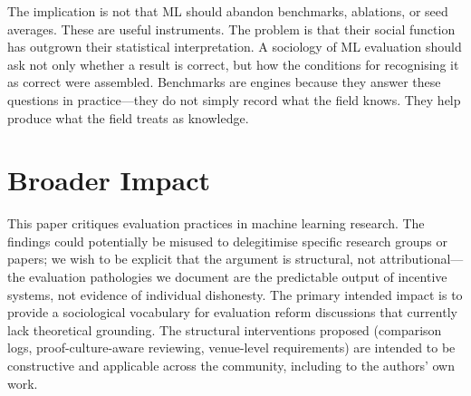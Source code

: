 \documentclass{article}
\begin{document}
The implication is not that ML should abandon benchmarks, ablations, or seed averages. These are useful instruments. The problem is that their social function has outgrown their statistical interpretation. A sociology of ML evaluation should ask not only whether a result is correct, but how the conditions for recognising it as correct were assembled. Benchmarks are engines because they answer these questions in practice---they do not simply record what the field knows. They help produce what the field treats as knowledge.

\section*{Broader Impact}

This paper critiques evaluation practices in machine learning research. The findings could potentially be misused to delegitimise specific research groups or papers; we wish to be explicit that the argument is structural, not attributional---the evaluation pathologies we document are the predictable output of incentive systems, not evidence of individual dishonesty. The primary intended impact is to provide a sociological vocabulary for evaluation reform discussions that currently lack theoretical grounding. The structural interventions proposed (comparison logs, proof-culture-aware reviewing, venue-level requirements) are intended to be constructive and applicable across the community, including to the authors' own work.


\end{document}
